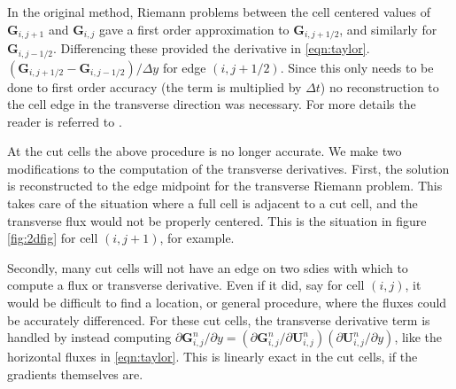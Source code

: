 In the original method, Riemann problems between the cell centered values of $\mathbf{G}_{i,j+1}$ and
$\mathbf{G}_{i,j}$ gave a first order  approximation to  $\mathbf{G}_{i,j+1/2}$,
and similarly for $\mathbf{G}_{i,j-1/2}$. Differencing these provided the 
derivative in \eqref{eqn:taylor}.
$(\mathbf{G}_{i,j+1/2} - \mathbf{G}_{i,j-1/2})/\Delta y$ for edge $(i,j+1/2)$.
Since this only needs to be done to first order accuracy (the term is multiplied
by $\Delta t$)  no reconstruction to the cell edge  in the transverse 
direction was necessary.
For more details the reader is referred to \cite{Colella:Unsplit}.

At the cut cells the above procedure is no longer accurate.   We make two modifications to the
computation of the transverse derivatives. First,
the solution is reconstructed to the edge midpoint  for the transverse Riemann problem.
This takes care of the situation where a full cell is adjacent to a cut cell, and
the transverse flux would not be properly centered. This is the situation
in figure \ref{fig:2dfig} for cell $(i,j+1)$, for example.

Secondly, many cut cells will not have an edge on two sdies with which to  compute a flux or transverse
derivative. Even if it did, say for cell $(i,j)$,  it would
be difficult to find a location, or general procedure,  where the fluxes could be accurately differenced.
For these cut cells, the transverse derivative term is handled by instead computing
$ \partial \mathbf{G}_{i,j}^n / \partial y = ( \partial \mathbf{G}_{i,j}^n / \partial \mathbf{U}_{i,j}^n)( \partial \mathbf{U}_{i,j}^n / \partial y)$,
like the horizontal fluxes in \eqref{eqn:taylor}. This is linearly exact in the cut cells, 
if the gradients themselves are.

